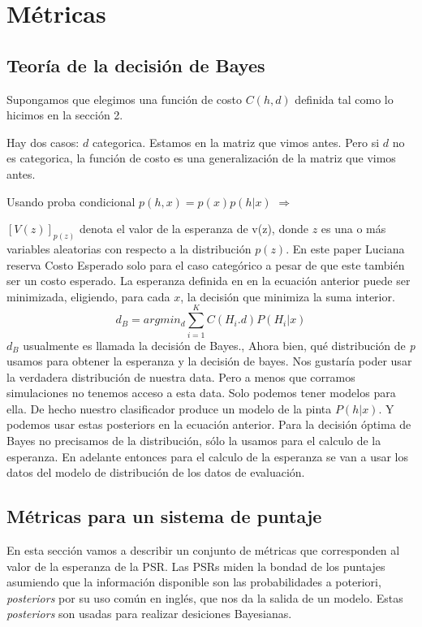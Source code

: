 \documentclass{book}
\begin{document}
\section{Métricas}

\subsection{Teoría de la decisión de Bayes}
Supongamos que elegimos una función de costo $C(h,d)$ definida tal como lo hicimos en la sección 2.

Hay dos casos:
$d$ categorica. Estamos en la matriz que vimos antes. Pero si $d$ no es categorica, la función de costo es una generalización de la matriz que vimos antes.

Usando proba condicional
$p(h,x) = p(x) p(h|x)$ 
$\Longrightarrow$

$[V(z)]_{p(z)}$ denota el valor de la esperanza de v(z), donde $z$ es una o más variables aleatorias con respecto a la distribución $p(z)$. En este paper Luciana reserva Costo Esperado solo para el caso categórico a pesar de que este también ser un costo esperado.
La esperanza definida en en la ecuación anterior puede ser minimizada, eligiendo, para cada $x$, la decisión que minimiza la suma interior.
\begin{equation}
    d_B = argmin _{d} \sum^K_{i=1} C(H_i. d) P(H_i|x) 
\end{equation}
$d_B$ usualmente es llamada la decisión de Bayes., 
Ahora bien, qué distribución de \textit{p} usamos para obtener la esperanza y la decisión de bayes.   Nos gustaría poder usar la verdadera distribución de nuestra data. Pero a menos que corramos simulaciones no tenemos acceso a esta data. Solo podemos tener modelos para ella. De hecho nuestro clasificador produce un modelo de la pinta $P(h|x)$. Y podemos usar estas posteriors en la ecuación anterior. Para la decisión óptima de Bayes no precisamos de la distribución, sólo la usamos para el calculo de la esperanza. En adelante entonces para el calculo de la esperanza se van a usar los datos del modelo de distribución de los datos de evaluación. 

\subsection{Métricas para un sistema de puntaje}

En esta sección vamos a describir un conjunto de métricas que corresponden al valor de la esperanza de la PSR. Las PSRs miden la bondad de los puntajes asumiendo que la información disponible son las probabilidades a poteriori, \textit{posteriors} por su uso común en inglés, que nos da la salida de un modelo. Estas \textit{posteriors} son usadas para realizar desiciones Bayesianas. 
\end{document}
